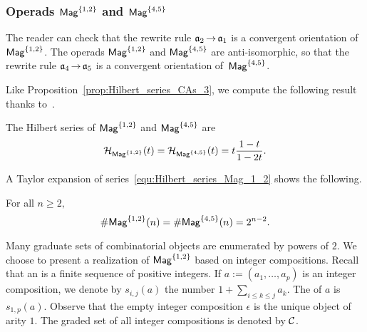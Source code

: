 \subsubsection{Operads $\mathsf{Mag}^{\{1, 2\}}$ and $\mathsf{Mag}^{\{4, 5\}}$}
\label{subsubsec:Mag_1_2}
The reader can check that the rewrite rule $\mathfrak{a}_2 \operatorname{\to} \mathfrak{a}_1$ is a
convergent orientation of $\mathsf{Mag}^{\{1, 2\}}$. The operads
$\mathsf{Mag}^{\{1, 2\}}$ and $\mathsf{Mag}^{\{4, 5\}}$ are anti-isomorphic, so that the
rewrite rule $\mathfrak{a}_4 \operatorname{\to} \mathfrak{a}_5$ is a convergent orientation
of~$\mathsf{Mag}^{\{4, 5\}}$.
\medbreak

Like Proposition~\ref{prop:Hilbert_series_CAs_3}, we compute the
following result thanks to~\cite{Gir18}.

\begin{Theorem} \label{thm:Hilbert_series_Mag_1_2}
    The Hilbert series of $\mathsf{Mag}^{\{1, 2\}}$ and $\mathsf{Mag}^{\{4, 5\}}$ are
    \begin{equation} \label{equ:Hilbert_series_Mag_1_2}
        \mathcal{H}_{\mathsf{Mag}^{\{1, 2\}}}(t)
        = \mathcal{H}_{\mathsf{Mag}^{\{4, 5\}}}(t) =
        t \frac{1 - t}{1 - 2t}.
    \end{equation}
\end{Theorem}
\medbreak

A Taylor expansion of series~\eqref{equ:Hilbert_series_Mag_1_2} shows
the following.

\begin{Proposition} \label{prop:Close_formula_Mag_1_2}
    For all $n \geq 2,$
    \begin{equation} \label{equ:Close_formula_Mag_1_2}
        \# \mathsf{Mag}^{\{1, 2\}}(n) = \# \mathsf{Mag}^{\{4, 5\}}(n) = 2^{n-2}.
    \end{equation}
\end{Proposition}
\medbreak

Many graduate sets of combinatorial objects are enumerated by powers of
$2$. We choose to present a realization of $\mathsf{Mag}^{\{1, 2\}}$ based on
integer compositions. Recall that an  is a
finite sequence of positive integers. If
$a := \left(a_1, \dots, a_p\right)$ is an integer composition, we denote
by $s_{i, j}(a)$ the number $1 + \sum_{i \leq k \leq j} a_k$. The
 of $a$ is $s_{1, p}(a)$. Observe that the empty integer
composition $\epsilon$ is the unique object of arity $1$. The graded set
of all integer compositions is denoted by $\mathcal{C}$.
\medbreak

